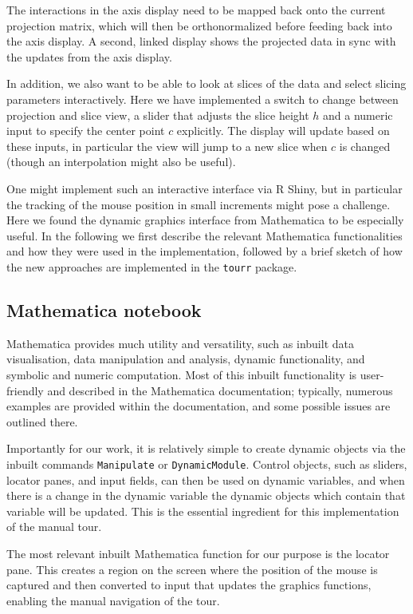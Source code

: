 \documentclass[]{interact}
\theoremstyle{plain}%
\theoremstyle{definition}
\theoremstyle{remark}
\begin{document}
The interactions in the axis display need to be mapped back onto the
current projection matrix, which will then be orthonormalized before
feeding back into the axis display. A second, linked display shows the
projected data in sync with the updates from the axis display.

In addition, we also want to be able to look at slices of the data and
select slicing parameters interactively. Here we have implemented a
switch to change between projection and slice view, a slider that
adjusts the slice height \(h\) and a numeric input to specify the center
point \(c\) explicitly. The display will update based on these inputs,
in particular the view will jump to a new slice when \(c\) is changed
(though an interpolation might also be useful).

One might implement such an interactive interface via R Shiny, but in
particular the tracking of the mouse position in small increments might
pose a challenge. Here we found the dynamic graphics interface from
Mathematica to be especially useful. In the following we first describe
the relevant Mathematica functionalities and how they were used in the
implementation, followed by a brief sketch of how the new approaches are
implemented in the \texttt{tourr} package.

\hypertarget{mathematica-notebook}{%
\subsection{Mathematica notebook}\label{mathematica-notebook}}

Mathematica provides much utility and versatility, such as inbuilt data
visualisation, data manipulation and analysis, dynamic functionality,
and symbolic and numeric computation. Most of this inbuilt functionality
is user-friendly and described in the Mathematica documentation;
typically, numerous examples are provided within the documentation, and
some possible issues are outlined there.

Importantly for our work, it is relatively simple to create dynamic
objects via the inbuilt commands \texttt{Manipulate} or
\texttt{DynamicModule}. Control objects, such as sliders, locator panes,
and input fields, can then be used on dynamic variables, and when there
is a change in the dynamic variable the dynamic objects which contain
that variable will be updated. This is the essential ingredient for this
implementation of the manual tour.

The most relevant inbuilt Mathematica function for our purpose is the
locator pane. This creates a region on the screen where the position of
the mouse is captured and then converted to input that updates the
graphics functions, enabling the manual navigation of the tour.
\end{document}
